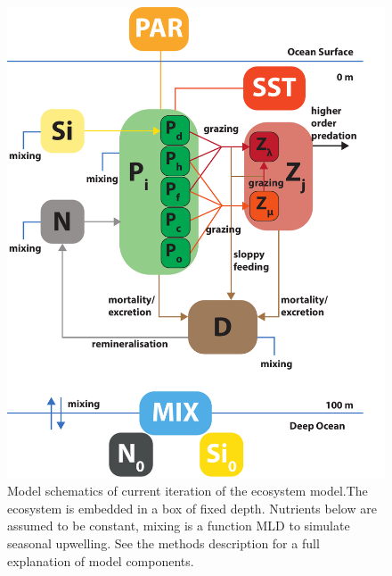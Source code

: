 \begin{figure}
\centering
\includegraphics[trim = 0mm 0mm 0mm 0mm, clip, width=1.\linewidth]{./Chp2-Pre/ModelSchematicsAsset1111.pdf}
\caption[Scheme]{\small {Model schematics of current iteration of the ecosystem model.The ecosystem is embedded in a box of fixed depth. Nutrients below are assumed to be constant, mixing is a function MLD to simulate seasonal upwelling. See the methods description for a full explanation of model components.}}
\label{ModelSchematics}
\end{figure}



